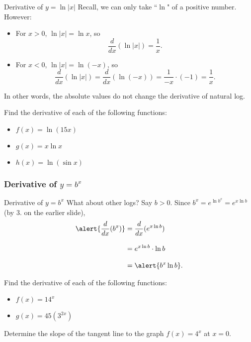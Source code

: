 \documentclass[cal1spr16Lectures.tex]{subfiles}
\begin{document}
\begin{frame}{\small Derivative of $y=\ln |x|$}\footnotesize
Recall, we can only take ``$\ln{}$" of a positive number.  However:
\begin{itemize}
\item For $x>0$, $\ln |x| = \ln x$, so 
\[\frac{d}{dx} (\ln |x|)=\frac{1}{x}.\]
\item For $x<0$, $\ln |x| = \ln(-x)$, so 
\[\frac{d}{dx} (\ln |x|)= \frac{d}{dx} (\ln(-x)) = \frac{1}{-x} \cdot (-1) = \frac{1}{x}.\]
\end{itemize}
In other words, the absolute values do not change the derivative of natural log.
\end{frame}

\begin{frame}
\begin{exe} Find the derivative of each of the following functions:
\begin{itemize}
\item $f(x)=\ln(15x)$
\item $g(x)=x \ln x$
\item $h(x)=\ln(\sin x)$
\end{itemize}
\end{exe}
\end{frame}

\subsubsection{Derivative of $y=b^x$}

\begin{frame}{\small Derivative of $y=b^x$}
What about other logs?  Say $b>0$.  Since $b^x=e^{\ln b^x}=e^{x \ln b}$ (by 3. on the earlier slide), 
\begin{align*}
\alert{\frac{d}{dx}(b^x)} &= \frac{d}{dx}(e^{x \ln b}) \\[0.75pc]
 &=e^{x \ln b} \cdot \ln b \\[0.75pc]
 &= \alert{b^x \ln b}.
\end{align*}
\end{frame}

\begin{frame}
\begin{exe} Find the derivative of each of the following functions:
\begin{itemize}
\item $f(x)=14^x$
\item $g(x)=45(3^{2x})$
\end{itemize}
\end{exe}
\begin{exe} Determine the slope of the tangent line to the graph $f(x)=4^x$ at $x=0$. \end{exe}
\end{frame}
\end{document}
